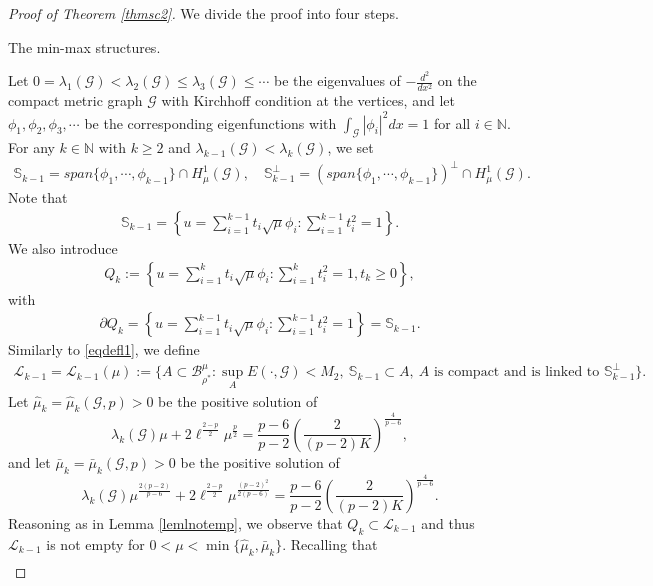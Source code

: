 \documentclass[10pt,a4paper]{article}
\theoremstyle{definition} \theoremstyle{remark}
\numberwithin{equation}{section}
\newcommand{\G}{\mathcal{G}}
\newcommand{\N}{\mathbb{N}}
\newcommand{\B}{\mathcal{B}}
\newcommand{\s}{\mathbb{S}}
\newcommand{\cl}{\mathcal{L}}
\newcommand{\la}{\lambda}
\begin{document}
\begin{proof}[Proof of Theorem \ref{thmsc2}]
	We divide the proof into four steps.
	
	\vskip0.1in
	 The min-max structures.
	
	Let $0=\la_1(\G) < \la_2(\G) \leq \la_3(\G) \leq \cdots $ be the eigenvalues of $-\frac{d^2}{dx^2}$ on the compact metric graph $\G$ with Kirchhoff condition at the vertices, and let $\phi_1, \phi_2, \phi_3, \cdots$ be the corresponding eigenfunctions with $\int_\G|\phi_i|^2dx = 1$ for all $i \in \N$. For any $k \in \N$ with $k \geq 2$ and $\la_{k-1}(\G) < \la_k(\G)$, we set
	\begin{align*}
		\s_{k-1} = span\{\phi_1,\cdots,\phi_{k-1}\} \cap H^1_\mu(\G), \quad \s_{k-1}^\perp = (span\{\phi_1,\cdots,\phi_{k-1}\})^\perp \cap H^1_\mu(\G).
	\end{align*}
    Note that
    \begin{align*}
    	\s_{k-1} = \left\{u = \sum_{i=1}^{k-1}t_i\sqrt{\mu}\phi_i: \sum_{i=1}^{k-1}t_i^2 = 1\right\}.
    \end{align*}
    We also introduce
    \begin{align*}
    	Q_k := \left\{u = \sum_{i=1}^{k}t_i\sqrt{\mu}\phi_i: \sum_{i=1}^{k}t_i^2 = 1, t_k \geq 0\right\},
    \end{align*}
    with
    \begin{align*}
    	\partial Q_k = \left\{u = \sum_{i=1}^{k-1}t_i\sqrt{\mu}\phi_i: \sum_{i=1}^{k-1}t_i^2 = 1\right\} = \mathbb{S}_{k-1}.
    \end{align*}
    Similarly to \eqref{eqdefl1}, we define
    \begin{align*} 
    	\cl_{k-1} = \cl_{k-1}(\mu) := \bigl\{A \subset \B_{\rho^*}^\mu: \sup_A E(\cdot,\G) < M_2, \ \s_{k-1} \subset A, \ A \text{ is compact and is linked to } \s_{k-1}^\perp\bigr\}.
    \end{align*}
	Let $\hat{\mu}_k = \hat{\mu}_k(\G,p) > 0$ be the positive solution of
	$$
	\la_k(\G)\mu + 2\ell^{\frac{2-p}2}\mu^{\frac p2} = \frac{p-6}{p-2}\left( \frac2{(p-2)K}\right)^{\frac4{p-6}},
	$$
	and let $\bar{\mu}_k = \bar{\mu}_k(\G,p) > 0$ be the positive solution of
	$$
	\la_k(\G)\mu^{\frac{2(p-2)}{p-6}} + 2\ell^{\frac{2-p}2}\mu^{\frac{(p-2)^2}{2(p-6)}} = \frac{p-6}{p-2}\left( \frac2{(p-2)K}\right)^{\frac4{p-6}}.
	$$
	Reasoning as in Lemma \ref{lemlnotemp}, we observe that $Q_k \subset \cl_{k-1}$ and thus $\cl_{k-1}$ is not empty for $0 < \mu < \min\{\hat{\mu}_k,\bar{\mu}_k\}$. Recalling that
		\begin{align*}

\end{align*}
\end{proof}
\end{document}
